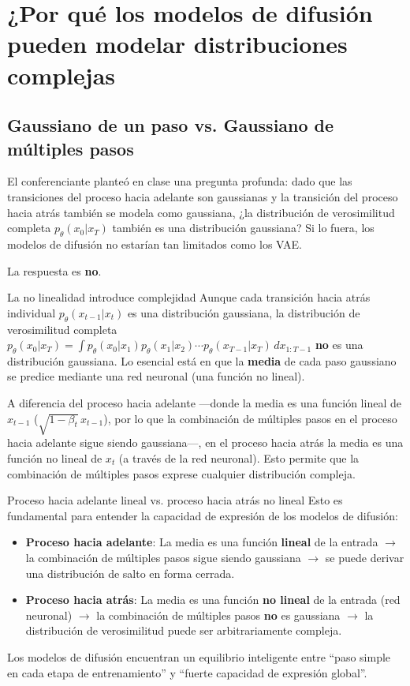\section{¿Por qué los modelos de difusión pueden modelar distribuciones complejas}

\subsection{Gaussiano de un paso vs. Gaussiano de múltiples pasos}

El conferenciante planteó en clase una pregunta profunda: dado que las transiciones del proceso hacia adelante son gaussianas y la transición del proceso hacia atrás también se modela como gaussiana, ¿la distribución de verosimilitud completa $p_\theta(x_0|x_T)$ también es una distribución gaussiana? Si lo fuera, los modelos de difusión no estarían tan limitados como los VAE.

La respuesta es \textbf{no}.

\begin{importantbox}{La no linealidad introduce complejidad}
Aunque cada transición hacia atrás individual $p_\theta(x_{t-1}|x_t)$ es una distribución gaussiana, la distribución de verosimilitud completa $p_\theta(x_0|x_T) = \int p_\theta(x_0|x_1) p_\theta(x_1|x_2) \cdots p_\theta(x_{T-1}|x_T) \, dx_{1:T-1}$ \textbf{no} es una distribución gaussiana. Lo esencial está en que la \textbf{media} de cada paso gaussiano se predice mediante una red neuronal (una función no lineal).

A diferencia del proceso hacia adelante —donde la media es una función lineal de $x_{t-1}$ ($\sqrt{1-\beta_t}\, x_{t-1}$), por lo que la combinación de múltiples pasos en el proceso hacia adelante sigue siendo gaussiana—, en el proceso hacia atrás la media es una función no lineal de $x_t$ (a través de la red neuronal). Esto permite que la combinación de múltiples pasos exprese cualquier distribución compleja.
\end{importantbox}

\begin{warningbox}{Proceso hacia adelante lineal vs. proceso hacia atrás no lineal}
Esto es fundamental para entender la capacidad de expresión de los modelos de difusión:
\begin{itemize}
    \item \textbf{Proceso hacia adelante}: La media es una función \textbf{lineal} de la entrada $\rightarrow$ la combinación de múltiples pasos sigue siendo gaussiana $\rightarrow$ se puede derivar una distribución de salto en forma cerrada.
    \item \textbf{Proceso hacia atrás}: La media es una función \textbf{no lineal} de la entrada (red neuronal) $\rightarrow$ la combinación de múltiples pasos \textbf{no} es gaussiana $\rightarrow$ la distribución de verosimilitud puede ser arbitrariamente compleja.
\end{itemize}
Los modelos de difusión encuentran un equilibrio inteligente entre ``paso simple en cada etapa de entrenamiento'' y ``fuerte capacidad de expresión global''.
\end{warningbox}

